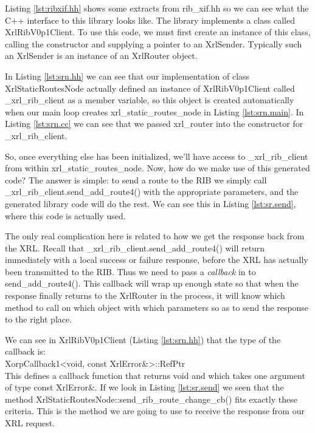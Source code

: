 \documentclass[11pt]{article}
\begin{document}
Listing \ref{lst:ribxif.hh} shows some extracts from {\stt
rib\_xif.hh} so we can see what the C++ interface to this library
looks like.  The library implements a class called {\stt
XrlRibV0p1Client}.  To use this code, we must first create an instance
of this class, calling the constructor and supplying a pointer to an
{\stt XrlSender}.  Typically such an XrlSender is an instance of an
{\stt XrlRouter} object.  

In Listing \ref{lst:srn.hh} we can see that our implementation of class
{\stt XrlStaticRoutesNode} actually defined an instance of {\stt
XrlRibV0p1Client} called {\stt \_xrl\_rib\_client} as a member
variable, so this object is created automatically when our main loop
creates {\stt xrl\_static\_routes\_node} in Listing
\ref{lst:srn.main}.  In Listing \ref{lst:srn.cc} we can see that we
passed {\stt xrl\_router} into the constructor for {\stt
\_xrl\_rib\_client}.

So, once everything else has been initialized, we'll have access
to {\stt \_xrl\_rib\_client} from within {\stt
xrl\_static\_routes\_node}.  Now, how do we make use of this generated
code?  The answer is simple: to send a route to the RIB we simply call
{\stt \_xrl\_rib\_client.send\_add\_route4()} with the appropriate
parameters, and the generated library code will do the rest.  We can
see this in Listing \ref{lst:sr.send}, where this code is actually used.

The only real complication here is related to how we get the response
back from the XRL.  Recall that {\stt
\_xrl\_rib\_client.send\_add\_route4()} will return immediately with a local
success or failure response, before the XRL has actually been
transmitted to the RIB.  Thus we need to pass a {\it callback} in to
{\stt send\_add\_route4()}.  This callback will wrap up enough state so
that when the response finally returns to the XrlRouter in the \SRI
process, it will know which method to call on which object with which
parameters so as to send the response to the right place.

We can see in {\stt XrlRibV0p1Client} (Listing \ref{lst:srn.hh}) that
the type of the callback is:\\
{\stt XorpCallback1<void, const XrlError\&>::RefPtr}\\
This defines a callback function that returns {\stt void} and which
takes one argument of type {\stt const XrlError\&}.  If we look in
Listing \ref{lst:sr.send} we seen that the method {\stt
XrlStaticRoutesNode::send\_rib\_route\_change\_cb()} fits exactly these
criteria.  This is the method we are going to use to receive the
response from our XRL request.
\end{document}
